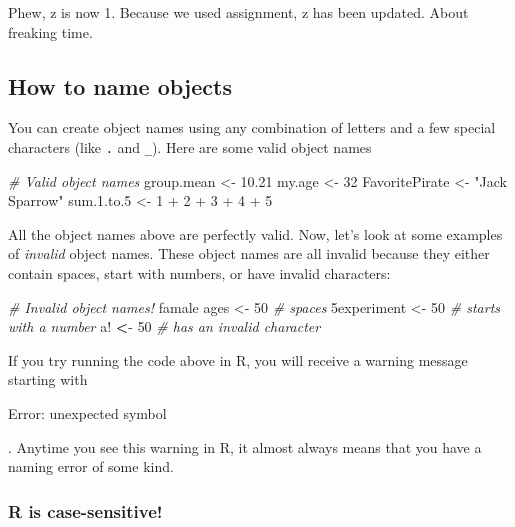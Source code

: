 \documentclass[]{book}
\newenvironment{Shaded}{\begin{snugshade}}{\end{snugshade}}
\newcommand{\DecValTok}[1]{\textcolor[rgb]{0.00,0.00,0.81}{{#1}}}
\newcommand{\FloatTok}[1]{\textcolor[rgb]{0.00,0.00,0.81}{{#1}}}
\newcommand{\StringTok}[1]{\textcolor[rgb]{0.31,0.60,0.02}{{#1}}}
\newcommand{\CommentTok}[1]{\textcolor[rgb]{0.56,0.35,0.01}{\textit{{#1}}}}
\newcommand{\ErrorTok}[1]{\textcolor[rgb]{0.64,0.00,0.00}{\textbf{{#1}}}}
\newcommand{\NormalTok}[1]{{#1}}
\theoremstyle{definition}
\theoremstyle{definition}
\theoremstyle{remark}
\begin{document}
Phew, z is now 1. Because we used assignment, z has been updated. About
freaking time.

\subsection{How to name objects}\label{how-to-name-objects}

You can create object names using any combination of letters and a few
special characters (like \texttt{.} and \texttt{\_}). Here are some
valid object names

\begin{Shaded}
\begin{Highlighting}[]
\CommentTok{# Valid object names}
\NormalTok{group.mean <-}\StringTok{ }\FloatTok{10.21}
\NormalTok{my.age <-}\StringTok{ }\DecValTok{32}
\NormalTok{FavoritePirate <-}\StringTok{ "Jack Sparrow"}
\NormalTok{sum}\FloatTok{.1}\NormalTok{.to}\FloatTok{.5} \NormalTok{<-}\StringTok{ }\DecValTok{1} \NormalTok{+}\StringTok{ }\DecValTok{2} \NormalTok{+}\StringTok{ }\DecValTok{3} \NormalTok{+}\StringTok{ }\DecValTok{4} \NormalTok{+}\StringTok{ }\DecValTok{5}
\end{Highlighting}
\end{Shaded}

All the object names above are perfectly valid. Now, let's look at some
examples of \emph{invalid} object names. These object names are all
invalid because they either contain spaces, start with numbers, or have
invalid characters:

\begin{Shaded}
\begin{Highlighting}[]
\CommentTok{# Invalid object names!}
\NormalTok{famale ages <-}\StringTok{ }\DecValTok{50} \CommentTok{# spaces}
\NormalTok{5experiment <-}\StringTok{ }\DecValTok{50} \CommentTok{# starts with a number}
\NormalTok{a!}\StringTok{ }\ErrorTok{<}\NormalTok{-}\StringTok{ }\DecValTok{50} \CommentTok{# has an invalid character}
\end{Highlighting}
\end{Shaded}

If you try running the code above in R, you will receive a warning
message starting with

Error: unexpected symbol

. Anytime you see this warning in R, it almost always means that you
have a naming error of some kind.

\subsubsection{R is case-sensitive!}\label{r-is-case-sensitive}
\end{document}
